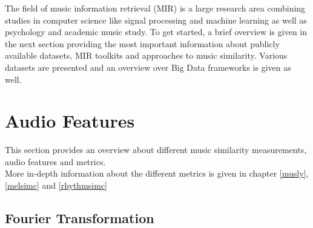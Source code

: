The field of music information retrieval (MIR) is a large research area combining studies in computer science like signal processing and machine learning as well as psychology and academic music study. To get started, a brief overview is given in the next section providing the most important information about publicly available datasets, MIR toolkits and approaches to music similarity. Various datasets are presented and an overview over Big Data frameworks is given as well.

\section{Audio Features}

This section provides an overview about different music similarity measurements, audio features and metrics.\\
More in-depth information about the different metrics is given in chapter \ref{musly}, \ref{melsimc} and \ref{rhythmsimc}

\subsection{Fourier Transformation}\label{featsec}

